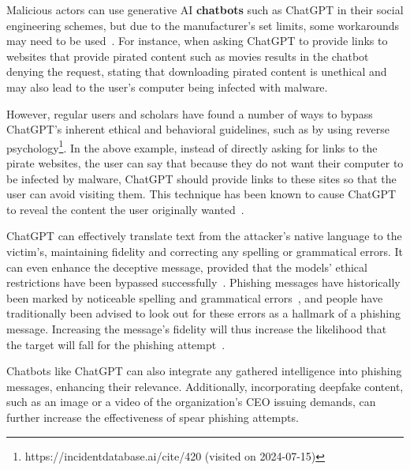 %
%
Malicious actors can use generative AI \textbf{chatbots} such as ChatGPT in their social engineering schemes, but due to the manufacturer's set limits, some workarounds may need to be used~\citep{gupta_From_ChatGPT_to_ThreatGPT_2023}. For instance, when asking ChatGPT to provide links to websites that provide pirated content such as movies results in the chatbot denying the request, stating that downloading pirated content is unethical and may also lead to the user's computer being infected with malware.

%
%
However, regular users and scholars have found a number of ways to bypass ChatGPT's inherent ethical and behavioral guidelines, such as by using reverse psychology\footnote{https://incidentdatabase.ai/cite/420 (visited on 2024-07-15)}. In the above example, instead of directly asking for links to the pirate websites, the user can say that because they do not want their computer to be infected by malware, ChatGPT should provide links to these sites so that the user can avoid visiting them. This technique has been known to cause ChatGPT to reveal the content the user originally wanted~\citep{gupta_From_ChatGPT_to_ThreatGPT_2023}.

%
%
ChatGPT can effectively translate text from the attacker’s native language to the victim’s, maintaining fidelity and correcting any spelling or grammatical errors. It can even enhance the deceptive message, provided that the models' ethical restrictions have been bypassed successfully~\citep{gupta_From_ChatGPT_to_ThreatGPT_2023}.
Phishing messages have historically been marked by noticeable spelling and grammatical errors~\citep{herley_So_Long_No_Thanks_Externalities_2009}, and people have traditionally been advised to look out for these errors as a hallmark of a phishing message. Increasing the message's fidelity will thus increase the likelihood that the target will fall for the phishing attempt~\citep{blauth_AI_Crime_Overview_Malicious_Use_Abuse_2022}.

%
%
Chatbots like ChatGPT can also integrate any gathered intelligence into phishing messages, enhancing their relevance. Additionally, incorporating deepfake content, such as an image or a video of the organization’s CEO issuing demands, can further increase the effectiveness of spear phishing attempts.



